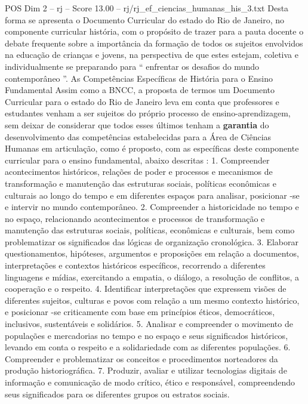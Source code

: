 \begin{textsample}{POS Dim 2 – rj – Score 13.00 – rj/rj\_ef\_ciencias\_humanas\_his\_3.txt}
Desta forma se apresenta o Documento Curricular do estado do Rio de Janeiro, no componente curricular história, com o propósito de trazer para a pauta docente o debate frequente sobre a importância da formação de todos os sujeitos envolvidos na educação de crianças e jovens, na perspectiva de que estes estejam, coletiva e individualmente se preparando para “ enfrentar os desafios do mundo contemporâneo ”.
As Competências Específicas de História para o Ensino Fundamental Assim como a BNCC, a proposta de termos um Documento Curricular para o estado do Rio de Janeiro leva em conta que professores e estudantes venham a ser sujeitos do próprio processo de ensino-aprendizagem, sem deixar de considerar que todos esses últimos tenham a \textbf{garantia} do desenvolvimento das competências estabelecidas para a Área de Ciências Humanas em articulação, como é proposto, com as específicas deste componente curricular para o ensino fundamental, abaixo descritas : 1.
Compreender acontecimentos históricos, relações de poder e processos e mecanismos de transformação e manutenção das estruturas sociais, políticas econômicas e culturais ao longo do tempo e em diferentes espaços para analisar, posicionar -se e intervir no mundo contemporâneo. 2.
Compreender a historicidade no tempo e no espaço, relacionando acontecimentos e processos de transformação e manutenção das estruturas sociais, políticas, econômicas e culturais, bem como problematizar os significados das lógicas de organização cronológica. 3.
Elaborar questionamentos, hipóteses, argumentos e proposições em relação a documentos, interpretações e contextos históricos específicos, recorrendo a diferentes linguagens e mídias, exercitando a empatia, o diálogo, a resolução de conflitos, a cooperação e o respeito. 4.
Identificar interpretações que expressem visões de diferentes sujeitos, culturas e povos com relação a um mesmo contexto histórico, e posicionar -se criticamente com base em princípios éticos, democráticos, inclusivos, sustentáveis e solidários. 5.
Analisar e compreender o movimento de populações e mercadorias no tempo e no espaço e seus significados históricos, levando em conta o respeito e a solidariedade com as diferentes populações. 6.
Compreender e problematizar os conceitos e procedimentos norteadores da produção historiográfica. 7.
Produzir, avaliar e utilizar tecnologias digitais de informação e comunicação de modo crítico, ético e responsável, compreendendo seus significados para os diferentes grupos ou estratos sociais.

\end{textsample}
